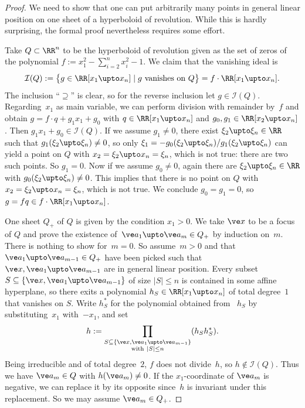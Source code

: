 \documentclass[reqno]{amsart}
\begin{document}
\begin{proof}
  We need to show that one can put arbitrarily many points in general
  linear position on one sheet of a hyperboloid of revolution. While
  this is hardly surprising, the formal proof nevertheless requires
  some effort.
  
  Take $Q \subset \RR^n$ to be the hyperboloid of revolution given as
  the set of zeros of the polynomial
  $f := x_1^2 - \sum_{i=2}^n x_i^2 - 1$. We claim that the vanishing
  ideal is
  \[
    \mathcal I(Q) := \bigl\{g \in \RR[x_1 \upto x_n] \mid g \
    \text{vanishes on} \ Q\bigr\} = f \cdot \RR[x_1 \upto x_n].
  \]
  The inclusion ``$\supseteq$'' is clear, so for the reverse inclusion
  let $g \in \mathcal I(Q)$. Regarding~$x_1$ as main variable, we can
  perform division with remainder by~$f$ and obtain
  $g = f \cdot q + g_1 x_1 + g_0$ with $q \in \RR[x_1 \upto x_n]$ and
  $g_0,g_1 \in \RR[x_2 \upto x_n]$. Then
  $g_1 x_1 + g_0 \in \mathcal I(Q)$. If we assume $g_1 \ne 0$, there
  exist $\xi_2 \upto \xi_n \in \RR$ such that
  $g_1(\xi_2 \upto \xi_n) \ne 0$, so only
  $\xi_1 = -g_0(\xi_2 \upto \xi_n)/g_1(\xi_2 \upto \xi_n)$ can yield a
  point on $Q$ with $x_2 = \xi_2 \upto x_n = \xi_n$, which is not
  true: there are two such points. So $g_1 = 0$. Now if we assume
  $g_0 \ne 0$, again there are $\xi_2 \upto \xi_n \in \RR$ with
  $g_0(\xi_2 \upto \xi_n) \ne 0$. This implies that there is no point
  on $Q$ with $x_2 = \xi_2 \upto x_n = \xi_n$, which is not true. We
  conclude $g_0 = g_1 = 0$, so
  $g = f q \in f \cdot \RR[x_1 \upto x_n]$.

  One sheet $Q_+$ of $Q$ is given by the condition $x_1 > 0$. We take
  $\ve x$ to be a focus of $Q$ and prove the existence
  of~$\ve a_1 \upto \ve a_m \in Q_+$ by induction on~$m$. There is
  nothing to show for~$m = 0$. So assume~$m > 0$ and that
  $\ve a_1 \upto \ve a_{m-1} \in Q_+$ have been picked such that
  $\ve x,\ve a_1 \upto \ve a_{m-1}$ are in general linear
  position. Every subset
  $S \subseteq \{\ve x,\ve a_1 \upto \ve a_{m-1}\}$ of size
  $|S| \le n$ is contained in some affine hyperplane, so there exits a
  polynomial $h_S \in \RR[x_1 \upto x_n]$ of total degree~$1$ that
  vanishes on $S$. Write $h_S^*$ for the polynomial obtained from
  ~$h_S$ by substituting~$x_1$ with~$-x_1$, and set
  \[
    h := \prod_{\substack{S \subseteq \{\ve x,\ve a_1 \upto \ve
        a_{m-1}\} \\ \text{with} \ |S| \le n}} (h_S h_S^*).
  \]
  Being irreducible and of total degree~$2$, $f$ does not divide~$h$,
  so $h \notin \mathcal I(Q)$. Thus we have $\ve a_m \in Q$ with
  $h(\ve a_m) \ne 0$. If the $x_1$-coordinate of $\ve a_m$ is
  negative, we can replace it by its opposite since~$h$ is invariant
  under this replacement. So we may assume $\ve a_m \in Q_+$.


\end{proof}
\end{document}
